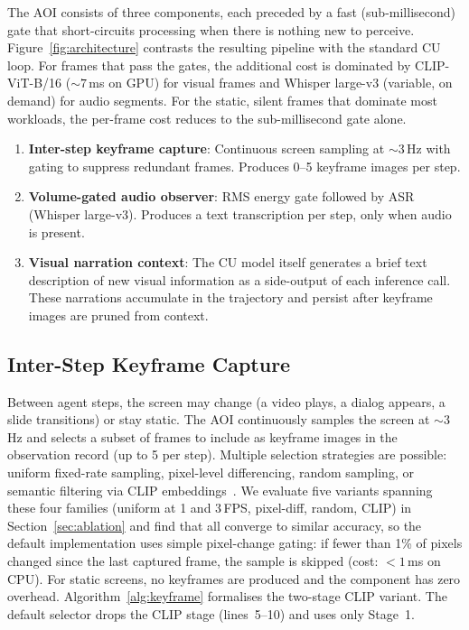 \documentclass[11pt]{article}
\begin{document}
The AOI consists of three components, each preceded by a fast (sub-millisecond) gate that short-circuits processing when there is nothing new to perceive. Figure~\ref{fig:architecture} contrasts the resulting pipeline with the standard CU loop.
For frames that pass the gates, the additional cost is dominated by CLIP-ViT-B/16 (${\sim}7$\,ms on GPU) for visual frames and Whisper large-v3 (variable, on demand) for audio segments. For the static, silent frames that dominate most workloads, the per-frame cost reduces to the sub-millisecond gate alone.

\begin{enumerate}[label=(\arabic*)]
  \item \textbf{Inter-step keyframe capture}: Continuous screen sampling at ${\sim}3$\,Hz with gating to suppress redundant frames. Produces 0--5 keyframe images per step.
  \item \textbf{Volume-gated audio observer}: RMS energy gate followed by ASR (Whisper large-v3). Produces a text transcription per step, only when audio is present.
  \item \textbf{Visual narration context}: The CU model itself generates a brief text description of new visual information as a side-output of each inference call. These narrations accumulate in the trajectory and persist after keyframe images are pruned from context.
\end{enumerate}

\subsection{Inter-Step Keyframe Capture}
\label{sec:keyframes}

Between agent steps, the screen may change (a video plays, a dialog appears, a slide transitions) or stay static.
The AOI continuously samples the screen at ${\sim}3$\,Hz and selects a subset of frames to include as keyframe images in the observation record (up to 5 per step).
Multiple selection strategies are possible: uniform fixed-rate sampling, pixel-level differencing, random sampling, or semantic filtering via CLIP embeddings~\citep{clip}.
We evaluate five variants spanning these four families (uniform at 1 and 3\,FPS, pixel-diff, random, CLIP) in Section~\ref{sec:ablation} and find that all converge to similar accuracy, so the default implementation uses simple pixel-change gating: if fewer than 1\% of pixels changed since the last captured frame, the sample is skipped (cost: ${<}1$\,ms on CPU).
For static screens, no keyframes are produced and the component has zero overhead.
Algorithm~\ref{alg:keyframe} formalises the two-stage CLIP variant. The default selector drops the CLIP stage (lines~5--10) and uses only Stage~1.
\end{document}
